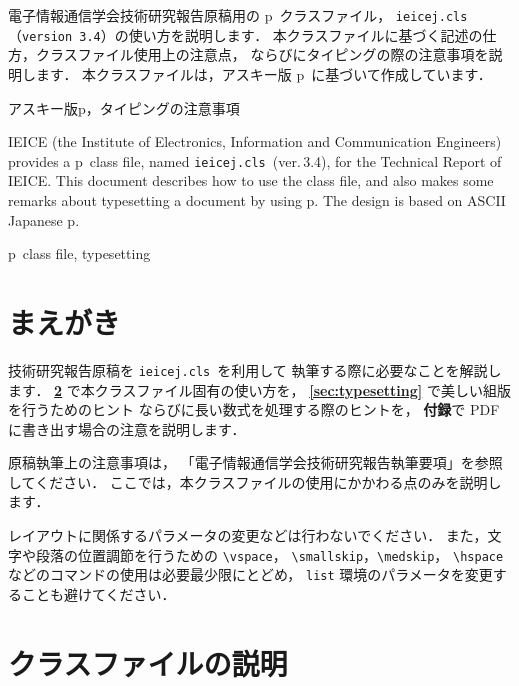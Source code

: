 \documentclass[technicalreport]{ieicej}
\def\IEICEJcls{\texttt{ieicej.cls}}
\def\IEICEJver{3.4}
\begin{document}
\begin{jabstract}
電子情報通信学会技術研究報告原稿用の p\LaTeXe\ クラスファイル，
\IEICEJcls{}（\texttt{version \IEICEJver}）の使い方を説明します．
本クラスファイルに基づく記述の仕方，クラスファイル使用上の注意点，
ならびにタイピングの際の注意事項を説明します．
本クラスファイルは，アスキー版 p\LaTeXe\ に基づいて作成しています．
\end{jabstract}
\begin{jkeyword}
アスキー版p\LaTeXe{}，タイピングの注意事項
\end{jkeyword}
\begin{eabstract}
IEICE (the Institute of Electronics, Information 
and Communication Engineers) provides 
a p\LaTeXe\ class file, named \IEICEJcls\ (ver.\,\IEICEJver), 
for the Technical Report of IEICE. 
This document describes how to use the class file, 
and also makes some remarks about typesetting a document by using p\LaTeXe. 
The design is based on ASCII Japanese p\LaTeXe. 
\end{eabstract}
\begin{ekeyword}
p\LaTeXe\ class file, typesetting
\end{ekeyword}
\maketitle

\section{まえがき}

技術研究報告原稿を \IEICEJcls\ を利用して
執筆する際に必要なことを解説します．
{\bfseries \ref{sec:cls}} で本クラスファイル固有の使い方を，
{\bfseries \ref{sec:typesetting}} で美しい組版を行うためのヒント
ならびに長い数式を処理する際のヒントを，
{\bfseries 付録}で PDF に書き出す場合の注意を説明します．

原稿執筆上の注意事項は，
「電子情報通信学会技術研究報告執筆要項」を参照してください．
ここでは，本クラスファイルの使用にかかわる点のみを説明します．

レイアウトに関係するパラメータの変更などは行わないでください．
また，文字や段落の位置調節を行うための \verb/\vspace/，
\verb/\smallskip/，\verb/\medskip/，
\verb/\hspace/ などのコマンドの使用は必要最少限にとどめ，
\texttt{list} 環境のパラメータを変更することも避けてください．

\section{クラスファイルの説明}
\label{sec:cls}
\end{document}
